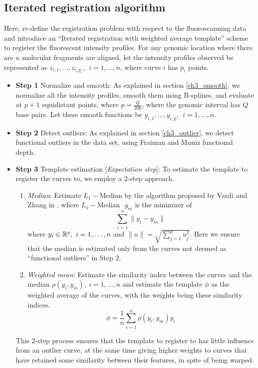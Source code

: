 \subsection{Iterated registration algorithm}
Here,  re-define the registration problem with respect to the fluoroscanning data and introduce an ``Iterated registration with weighted average template'' scheme to register the fluorescent intensity profiles.
For any genomic location where there are $n$ molecular fragments are aligned, let the intensity profiles observed be represented as $z_{i,1}, \dots, z_{i, p_i},\ \ i = 1,\dots, n$, where curve $i$ has $p_i$ points. 
\begin{itemize}
\item {\bf{Step 1}} Normalize and smooth: As explained in section \ref{ch3_smooth}, we normalize all the intensity profiles, smooth them using B-splines, and evaluate at $p + 1$ equidistant points, where $p = \frac{Q}{206}$, where the genomic interval has $Q$ base pairs. Let these smooth functions be $y_{i,1}, \dots, y_{i,p},\ \ i = 1,\dots,n$. 
\item {\bf{Step 2}} Detect outliers: As explained in section \ref{ch3_outlier}, we detect functional outliers in the data set, using Fraiman and Muniz functional depth. 
\item {\bf{Step 3}} Template estimation [{\emph{Expectation step}}]: To estimate the template to register the curves to, we employ a 2-step approach. 
\begin{enumerate}
\item {\emph{Median}}: Estimate $L_1-\text{Median}$ by the algorithm proposed by Vardi and Zhang in \cite{Vardi_Zhang_2000_PNAS}, where $L_1-\text{Median }$ $y_m$ is the minimizer of 
\[ \sum\limits_{i = 1}^n \|y_i - y_m \| \]
where $y_i \in \mathbb{R}^p, \ i = 1,\dots,n$ and $\|u \| = \sqrt{\sum\limits_{j = 1}^p u_j^2}$. Here we ensure that the median is estimated only from the curves not deemed as ``functional outliers'' in Step 2. 
\item {\emph{Weighted mean}}: Estimate the similarity index between the curves and the median $\rho(y_i, y_m), \ i = 1,\dots,n$ and estimate the template $\phi$ as the weighted average of the curves, with the weights being these similarity indices. 
\[ \phi = \frac{1}{n}\sum\limits_{i = 1}^n \rho(y_i, y_m) y_i \]
\end{enumerate}
This 2-step process ensures that the template to register to has little influence from an outlier curve, at the same time giving higher weights to curves that have retained some similarity between their features, in spite of being warped. 

\end{itemize}
